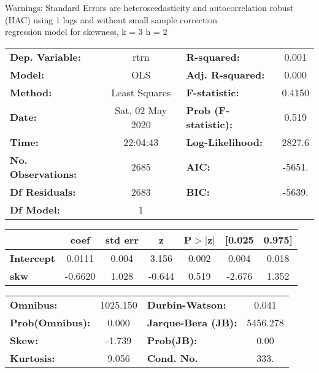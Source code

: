 Warnings: \newline
 [1] Standard Errors are heteroscedasticity and autocorrelation robust (HAC) using 1 lags and without small sample correction\\ 

regression model for skewness, k = 3 h = 2\begin{center}
\begin{tabular}{lclc}
\toprule
\textbf{Dep. Variable:}    &       rtrn       & \textbf{  R-squared:         } &     0.001   \\
\textbf{Model:}            &       OLS        & \textbf{  Adj. R-squared:    } &     0.000   \\
\textbf{Method:}           &  Least Squares   & \textbf{  F-statistic:       } &    0.4150   \\
\textbf{Date:}             & Sat, 02 May 2020 & \textbf{  Prob (F-statistic):} &    0.519    \\
\textbf{Time:}             &     22:04:43     & \textbf{  Log-Likelihood:    } &    2827.6   \\
\textbf{No. Observations:} &        2685      & \textbf{  AIC:               } &    -5651.   \\
\textbf{Df Residuals:}     &        2683      & \textbf{  BIC:               } &    -5639.   \\
\textbf{Df Model:}         &           1      & \textbf{                     } &             \\
\bottomrule
\end{tabular}
\begin{tabular}{lcccccc}
                   & \textbf{coef} & \textbf{std err} & \textbf{z} & \textbf{P$> |$z$|$} & \textbf{[0.025} & \textbf{0.975]}  \\
\midrule
\textbf{Intercept} &       0.0111  &        0.004     &     3.156  &         0.002        &        0.004    &        0.018     \\
\textbf{skw}       &      -0.6620  &        1.028     &    -0.644  &         0.519        &       -2.676    &        1.352     \\
\bottomrule
\end{tabular}
\begin{tabular}{lclc}
\textbf{Omnibus:}       & 1025.150 & \textbf{  Durbin-Watson:     } &    0.041  \\
\textbf{Prob(Omnibus):} &   0.000  & \textbf{  Jarque-Bera (JB):  } & 5456.278  \\
\textbf{Skew:}          &  -1.739  & \textbf{  Prob(JB):          } &     0.00  \\
\textbf{Kurtosis:}      &   9.056  & \textbf{  Cond. No.          } &     333.  \\
\bottomrule
\end{tabular}
\end{center}

